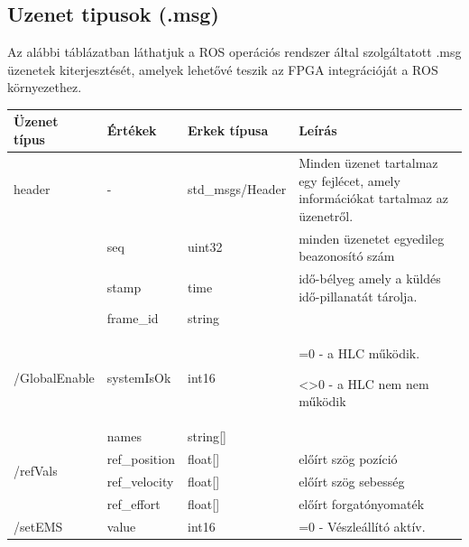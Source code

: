 \subsection{Uzenet tipusok (.msg)}
Az alábbi táblázatban láthatjuk a ROS operációs rendszer által szolgáltatott .msg üzenetek kiterjesztését, amelyek lehetővé teszik az FPGA integrációját a ROS környezethez.
\begin{table}[H]
\centering
\begin{tabular}{lllp{6cm}}
\hline \textbf{Üzenet típus}              & \textbf{Értékek}   & \textbf{Erkek típusa} & \textbf{Leírás} \\ \hline
 header                   &     -     &      std\_msgs/Header      &   Minden üzenet tartalmaz egy fejlécet, amely információkat tartalmaz az üzenetről. \\   
                          & seq       &      uint32        &   minden üzenetet egyedileg beazonosító szám     \\
                          & stamp     &      time        &  idő-bélyeg amely a küldés idő-pillanatát tárolja.      \\
                          & frame\_id  &      string        &        \\  \hline
                          
\hline  \multirow{1}{*}{/GlobalEnable}  &   systemIsOk        &    int16          &    
                                                                          =0 - a HLC működik.
                                                                          
                                                                          <>0 -  a HLC nem nem működik      \\    \hline                    
\hline\multirow{4}{*}{/refVals} & names     & string{[}{]} &        \\
                          & ref\_position  & float{[}{]}  & előírt szög pozíció       \\
                          & ref\_velocity & float{[}{]}  &  előírt szög sebesség      \\ 
                          & ref\_effort &    float{[}{]}  &  előírt forgatónyomaték    \\\hline
 \hline \multirow{1}{*}{/setEMS}  &   value        &     int16         &      =0 - Vészleállító aktív.
                                                                          

\end{tabular}
\end{table}
